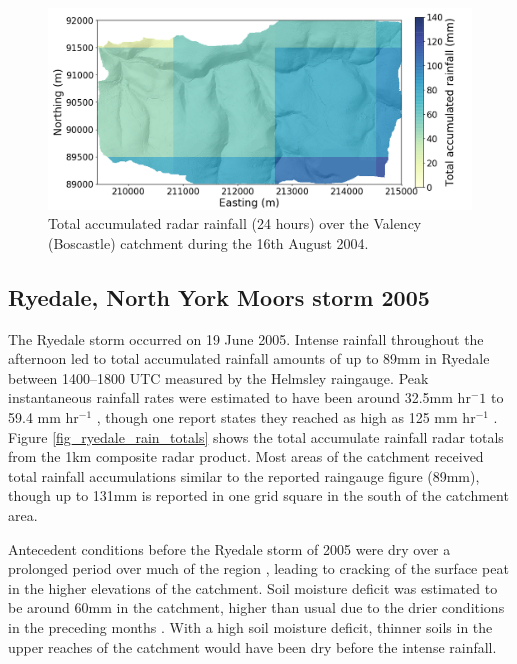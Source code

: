 \begin{figure}[htb]
\includegraphics[width=15cm]{chp_events_figures_scripts/figure_boscastle_total_rainfall.png}
\caption{Total accumulated radar rainfall (24 hours) over the Valency (Boscastle) catchment during the 16th August 2004.}
\label{fig_boscastle_rain_totals}
\end{figure}


\subsection{Ryedale, North York Moors storm 2005}
The Ryedale storm occurred on 19 June 2005. Intense rainfall throughout the afternoon led to total accumulated rainfall amounts of up to 89mm in Ryedale between 1400--1800 UTC measured by the Helmsley raingauge. Peak instantaneous rainfall rates were estimated to have been around 32.5mm hr\(^-1\) \citep{sibley2009analysis} to 59.4 mm hr\(^{-1}\) \citep{hopkins2012knowledge}, though one report states they reached as high as 125 mm hr\(^{-1}\) \citep{cinderey2005north}. Figure \ref{fig_ryedale_rain_totals} shows the total accumulate rainfall radar totals from the 1km composite radar product. Most areas of the catchment received total rainfall accumulations similar to the reported raingauge figure (89mm), though up to 131mm is reported in one grid square in the south of the catchment area.

Antecedent conditions before the Ryedale storm of 2005 were dry over a prolonged period over much of the region \citep{sibley2009analysis}, leading to cracking of the surface peat in the higher elevations of the catchment. Soil moisture deficit was estimated to be around 60mm in the catchment, higher than usual due to the drier conditions in the preceding months \citep{wass2008investigation}. With a high soil moisture deficit, thinner soils in the upper reaches of the catchment would have been dry before the intense rainfall.

